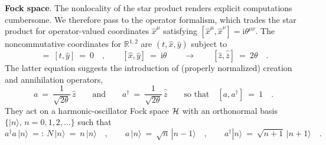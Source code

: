 \documentclass[a4paper,11pt]{article}
\numberwithin{equation}{section}
\newcommand{\R}{\mathbb R}
\newcommand{\Hcal}{{\cal H}}
\def\i{\mbox{i}}
\newcommand{\adag}{a^{\dagger}}
\newcommand{\zb}{\overline{z}}
\begin{document}
\noindent
{\bf Fock space}.
The nonlocality of the star product renders explicit computations cumbersome.
We therefore pass to the operator formalism,
which trades the star product for operator-valued coordinates
$\hat{x}^\mu$ satisfying $[\hat{x}^\mu,\hat{x}^\nu]=\i\theta^{\mu\nu}$.
The noncommutative coordinates for $\R^{1,2}$ are $(t,\hat{x},\hat{y})$
subject to
\begin{equation}
[t,\hat{x}]\ =\ [t,\hat{y}]\ =\ 0\quad, \qquad
[\hat{x},\hat{y}]\ =\ \i\theta
\qquad\longrightarrow\qquad
[\hat{z},\hat{\zb}]\ =\ 2\theta \quad.
\end{equation}
The latter equation suggests the introduction of (properly normalized)
creation and annihilation operators,
\begin{equation} \label{adef}
a\ =\ \frac{1}{\sqrt{2\theta}}\,\hat{z} \qquad\textrm{and}\qquad
\adag\ =\ \frac{1}{\sqrt{2\theta}}\,\hat{\zb} \qquad \textrm{so that}\quad
[a,\adag]\ =\ 1 \quad.
\end{equation}
They act on a harmonic-oscillator Fock space $\Hcal$ with an orthonormal basis
$\{|n\rangle,\,n=0,1,2,\ldots\}$ such that
\begin{equation}
\adag a\,|n\rangle\ =:\ N\,|n\rangle\ =\ n\,|n\rangle \quad,\qquad
a\,|n\rangle\ =\ \sqrt{n}\,|n{-}1\rangle \quad, \qquad
\adag|n\rangle\ =\ \sqrt{n{+}1}\,|n{+}1\rangle \quad .
\end{equation}
\end{document}
